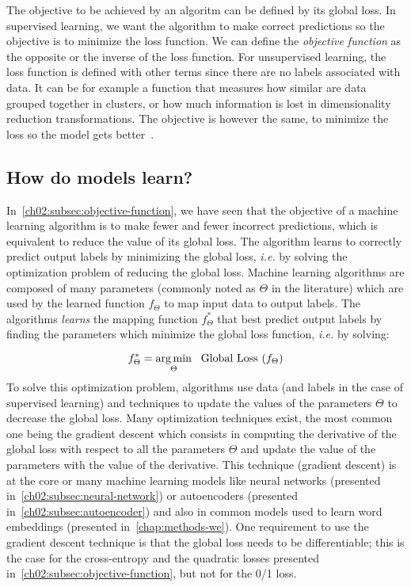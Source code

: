     The objective to be achieved by an algoritm can be defined by
    its global loss. In supervised learning, we want the algorithm to
    make correct predictions so the objective is to minimize the loss function.
    We can define the \textit{objective function} as the opposite or the inverse
    of the loss function. For unsupervised learning, the loss function is
    defined with other terms since there are no labels associated with data. It
    can be for example a function that measures how similar are data grouped
    together in clusters, or how much information is lost in dimensionality
    reduction transformations. The objective is however the same, to minimize
    the loss so the model gets better~\citep{pearson1901pca,
    jacob2009clustered}.

  \subsection{How do models learn?}
    \label{ch02:subsec:gradient}
    In~\autoref{ch02:subsec:objective-function}, we have seen that the objective
    of a machine learning algorithm is to make fewer and fewer incorrect
    predictions, which is equivalent to reduce the value of its global loss. The
    algorithm learns to correctly predict output labels by minimizing the global
    loss, \textit{i.e.} by solving the optimization problem of reducing the
    global loss. Machine learning algorithms are composed of many parameters
    (commonly noted as $\Theta$ in the literature) which are used by the learned
    function $f_\Theta$ to map input data to output labels. The algorithms
    \textit{learns} the mapping function $f_{\Theta}^*$ that best predict output
    labels by finding the parameters which minimize the global loss function,
    \textit{i.e.} by solving:

    \begin{equation}
      f_{\Theta}^* = \operatorname*{arg\,min}_{\Theta}~~\text{Global Loss  } (f_\Theta)
    \end{equation}
    To solve this optimization problem, algorithms use data (and labels in the
    case of supervised learning) and techniques to update the values of the
    parameters $\Theta$ to decrease the global loss. Many optimization
    techniques exist, the most common one being the gradient descent which
    consists in computing the derivative of the global loss with respect to all
    the parameters $\Theta$ and update the value of the parameters with the
    value of the derivative. This technique (gradient descent) is at the core or
    many machine learning models like neural networks (presented
    in~\autoref{ch02:subsec:neural-network}) or autoencoders (presented
    in~\autoref{ch02:subsec:autoencoder}) and also in common models used to
    learn word embeddings (presented in~\autoref{chap:methods-we}). One
    requirement to use the gradient descent technique is that the global loss
    needs to be differentiable; this is the case for the cross-entropy and the
    quadratic losses presented in~\autoref{ch02:subsec:objective-function}, but
    not for the 0/1 loss. \medskip

